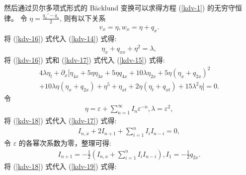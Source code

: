 然后通过贝尔多项式形式的 B\"{a}cklund 变换可以求得方程 (\ref{kdv-1}) 的无穷守恒律。
令 $\eta=\frac{q_x'-q_x}{2}$, 则有以下关系
\begin{align}
v_x=\eta, w_x=\eta+q_x.\label{kdv-16}
\end{align}
将 (\ref{kdv-16}) 式代入 (\ref{kdv-14}) 式得:
\begin{align}
\eta_x+q_{xx}+\eta^2=\lambda,\label{kdv-17}
\end{align}
将 (\ref{kdv-16}) 式和 (\ref{kdv-17}) 式代入 (\ref{kdv-15}) 式得:
\begin{align}
4\lambda\eta_t+\partial_x[\eta_{4x}+5\eta\eta_{3x}+5\eta q_{4x}+10\lambda\eta_{2x}+5\eta(\eta_x+q_{2x})^2\nonumber\\
+10\lambda\eta(\eta_x+q_{2x})+\eta^5+\eta_{xt}+2\eta(\eta_t+q_{xt})+15\lambda^2\eta]=0.\label{kdv-19}
\end{align}
令
\begin{align}
\eta=\varepsilon+\sum_{n=1}^\infty I_n\varepsilon^{-n}, \lambda=\varepsilon^2,\label{kdv-18}
\end{align}
将 (\ref{kdv-18}) 式代入 (\ref{kdv-17}) 式得:
\begin{align}
I_{n,x}+2I_{n+1}+\sum_{i=1}^nI_iI_{n-i}=0,\nonumber
\end{align}
令 $\varepsilon$ 的各幂次系数为零，整理可得:
\begin{align}
I_{n+1}=-\frac{1}{2}(I_{n,x}+\sum_{i=1}^nI_iI_{n-i}), I_1=-\frac{1}{2}q_{2x}.\nonumber
\end{align}
将 (\ref{kdv-18}) 式代入 (\ref{kdv-19}) 式得:
